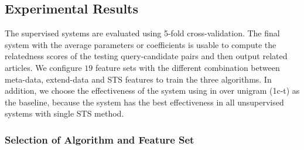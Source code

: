\subsection{Experimental Results}
\label{sec:6.4}

The supervised systems are evaluated using 5-fold cross-validation. The final system with the average parameters or coefficients is usable to compute the relatedness scores of the testing query-candidate pairs and then output related articles. We configure $19$ feature sets with the different combination between meta-data, extend-data and STS features to train the three algorithms. In addition, we choose the effectiveness of the system using \tfidf{} in \icontent{} over unigram (1c-t) as the baseline, because the system has the best effectiveness in all unsupervised systems with single STS method. 

\subsubsection{Selection of Algorithm and Feature Set}

